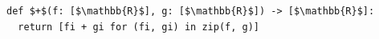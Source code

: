 \documentclass[border=10pt]{standalone}
\begin{document}
\begin{lstlisting}
def $+$(f: [$\mathbb{R}$], g: [$\mathbb{R}$]) -> [$\mathbb{R}$]:
  return [fi + gi for (fi, gi) in zip(f, g)]
\end{lstlisting}
\end{document}
